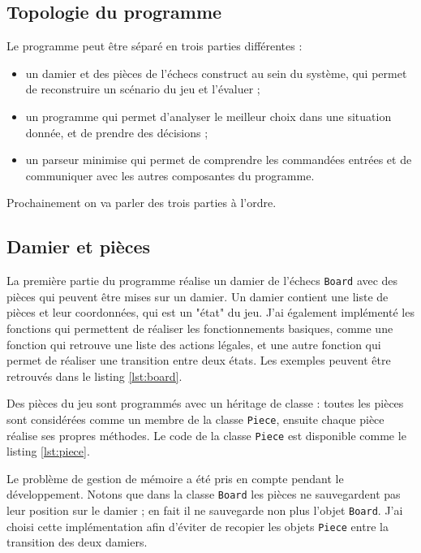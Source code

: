 \documentclass{article}
\begin{document}
\subsection{Topologie du programme}
\par Le programme peut être séparé en trois parties différentes :
\begin{itemize}
    \item un damier et des pièces de l'échecs construct au sein du système, qui permet de reconstruire un scénario du jeu et l'évaluer ;
    \item un programme qui permet d'analyser le meilleur choix dans une situation donnée, et de prendre des décisions ;
    \item un parseur minimise qui permet de comprendre les commandées entrées et de communiquer avec les autres composantes du programme.
\end{itemize}

\par Prochainement on va parler des trois parties à l'ordre.

\subsection{Damier et pièces}
\par La première partie du programme réalise un damier de l'échecs \texttt{Board} avec des pièces qui peuvent être mises sur un damier. Un damier contient une liste de pièces et leur coordonnées, qui est un "état" du jeu. J'ai également implémenté les fonctions qui permettent de réaliser les fonctionnements basiques, comme une fonction qui retrouve une liste des actions légales, et une autre fonction qui permet de réaliser une transition entre deux états. Les exemples peuvent être retrouvés dans le listing \ref{lst:board}.

\par Des pièces du jeu sont programmés avec un héritage de classe : toutes les pièces sont considérées comme un membre de la classe \texttt{Piece}, ensuite chaque pièce réalise ses propres méthodes. Le code de la classe \texttt{Piece} est disponible comme le listing \ref{lst:piece}.

\par Le problème de gestion de mémoire a été pris en compte pendant le développement. Notons que dans la classe \texttt{Board} les pièces ne sauvegardent pas leur position sur le damier ; en fait il ne sauvegarde non plus l'objet \texttt{Board}. J'ai choisi cette implémentation afin d'éviter de recopier les objets \texttt{Piece} entre la transition des deux damiers.
\end{document}
